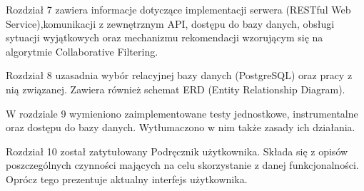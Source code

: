 \par Rozdział 7 zawiera informacje dotyczące implementacji serwera (RESTful Web Service),komunikacji z zewnętrznym API, dostępu do bazy danych, obsługi sytuacji wyjątkowych oraz mechanizmu rekomendacji wzorującym się na algorytmie Collaborative Filtering.

\par Rozdział 8 uzasadnia wybór relacyjnej bazy danych (PostgreSQL) oraz pracy z nią związanej. Zawiera również schemat ERD (Entity Relationship Diagram).

\par W rozdziale 9 wymieniono zaimplementowane testy jednostkowe, instrumentalne oraz dostępu do bazy danych. Wytłumaczono w nim także zasady ich działania.

\par Rozdział 10 został zatytułowany Podręcznik użytkownika. Składa się z opisów poszczególnych czynności mających na celu skorzystanie z danej funkcjonalności. Oprócz tego prezentuje aktualny interfejs użytkownika.
